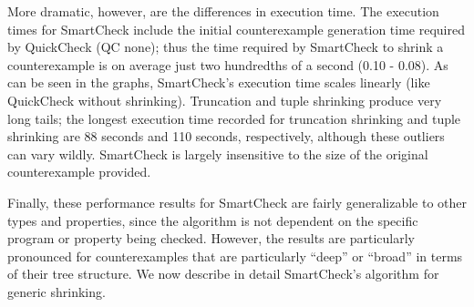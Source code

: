\documentclass{sigplanconf}
\newenvironment{code}{\begin{alltt}\footnotesize}{\end{alltt}}
\newcommand{\ttp}[1]{\texttt{#1}}
\begin{document}
More dramatic, however, are the differences in execution time.  The execution
times for SmartCheck include the initial counterexample generation time required
by QuickCheck (QC none); thus the time required by SmartCheck to shrink a
counterexample is on average just two hundredths of a second (0.10 - 0.08).  As
can be seen in the graphs, SmartCheck's execution time scales linearly (like
QuickCheck without shrinking).  Truncation and tuple shrinking produce very long
tails; the longest execution time recorded for truncation shrinking and tuple
shrinking are 88 seconds and 110 seconds, respectively, although these outliers
can vary wildly.  SmartCheck is largely insensitive to the size of the original
counterexample provided.


Finally, these performance results for SmartCheck are fairly generalizable to
other types and properties, since the algorithm is not dependent on the specific
program or property being checked.  However, the results are particularly
pronounced for counterexamples that are particularly ``deep'' or ``broad'' in
terms of their tree structure.  %
We now describe in detail SmartCheck's algorithm for generic shrinking.






\end{document}
